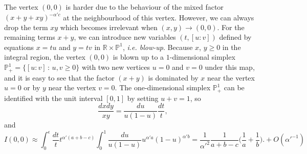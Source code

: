 \documentclass[12pt]{article}
\theoremstyle{definition}
\theoremstyle{plain}
\begin{document}
The vertex $(0,0)$ is harder due to the behaviour of the mixed factor $(x+y+xy)^{-\alpha' c}$ at the neighbourhood of this vertex. %
However, we can always drop the term $xy$ which becomes irrelevant when $(x,y)\to (0,0)$. %
For the remaining terms $x+y$, 
we can introduce new variables $(t,[u:v])$ defined by equations $x = tu$ and $y=tv$ in
$\mathbb R\times\mathbb P^1$, \textit{i.e. blow-up}. Because $x$, $y\geq 0$ in the integral region,
the vertex $(0,0)$ is blown up to a $1$-dimensional simplex $\mathbb P^1_+=\{[u:v]\,:\,u,v\geq 0\}$ 
with two new vertices $u=0$ and $v=0$ under this map, 
and it is easy to see that the factor $(x+y)$ is dominated by $x$ near the vertex $u=0$ or 
by $y$ near the vertex $v = 0$.
The one-dimensional simplex $\mathbb P^1_+$ can be identified with 
the unit interval $[0,1]$ by setting $u+v=1$, so
 \begin{equation}\label{canonicalformunderblowup}
	\frac{dxdy}{xy} = \frac{du}{u(1-u)}\frac{dt}{t},
 \end{equation}
and
\begin{equation*}
	I(0,0)\approx\int_0^\epsilon\frac{dt}{t} t^{\alpha'(a+b-c)}\int_0^{1}\frac{du}{u(1-u)}u^{\alpha' a}(1-u)^{\alpha' b}%
	= \frac{1}{{\alpha'}^2}\frac{1}{a+b-c}\biggl(\frac 1a+\frac 1b\biggr).
	+O({\alpha'}^{-1})
\end{equation*}
\end{document}
